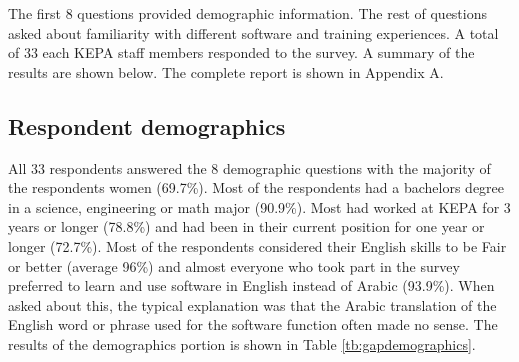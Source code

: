 The first 8 questions provided demographic information. The rest of questions asked about familiarity with different software and training experiences.  A total of 33 each KEPA staff members responded to the survey. A summary of the results are shown below. The complete report is shown in Appendix A.

\subsection{Respondent demographics}
All 33 respondents answered the 8 demographic questions with the majority of the respondents women (69.7\%). Most of the respondents had a bachelors degree in a science, engineering or math major (90.9\%). Most had worked at KEPA for 3 years or longer (78.8\%) and had been in their current position for one year or longer (72.7\%). Most of the respondents considered their English skills to be Fair or better (average 96\%) and almost everyone who took part in the survey preferred to learn and use software in English instead of Arabic (93.9\%). When asked about this, the typical explanation was that the Arabic translation of the English word or phrase used for the software function often made no sense. The results of the demographics portion is shown in Table \ref{tb:gapdemographics}.


